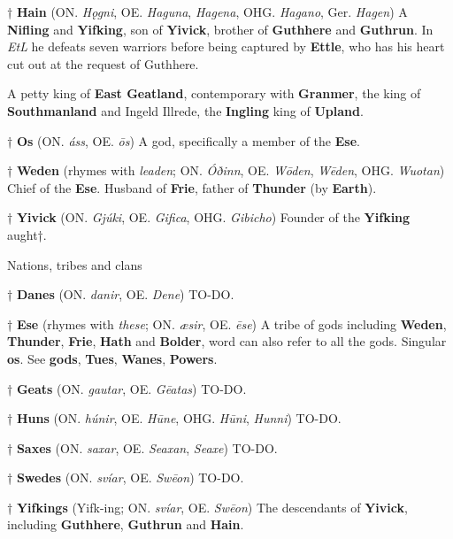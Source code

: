 † \textbf{Hain} (ON. \emph{Hǫgni}, OE. \emph{Haguna}, \emph{Hagena}, OHG. \emph{Hagano}, Ger. \emph{Hagen})
 A \textbf{Nifling} and \textbf{Yifking}, son of \textbf{Yivick}, brother of \textbf{Guthhere} and \textbf{Guthrun}. In \emph{EtL} he defeats seven warriors before being captured by \textbf{Ettle}, who has his heart cut out at the request of Guthhere.
 
 A petty king of \textbf{East Geatland}, contemporary with \textbf{Granmer}, the king of \textbf{Southmanland} and Ingeld Illrede, the \textbf{Ingling} king of \textbf{Upland}.

† \textbf{Os} (ON. \emph{áss}, OE. \emph{ōs})
 A god, specifically a member of the \textbf{Ese}.
 
† \textbf{Weden} (rhymes with \emph{leaden}; ON. \emph{Óðinn}, OE. \emph{Wōden}, \emph{Wēden}, OHG. \emph{Wuotan})
 Chief of the \textbf{Ese}. Husband of \textbf{Frie}, father of \textbf{Thunder} (by \textbf{Earth}).

† \textbf{Yivick} (ON. \emph{Gjúki}, OE. \emph{Gifica}, OHG. \emph{Gibicho})
 Founder of the \textbf{Yifking} aught†.

Nations, tribes and clans

† \textbf{Danes} (ON. \emph{danir}, OE. \emph{Dene})
 TO-DO.

† \textbf{Ese} (rhymes with \emph{these}; ON. \emph{æsir}, OE. \emph{ēse})
 A tribe of gods including \textbf{Weden}, \textbf{Thunder}, \textbf{Frie}, \textbf{Hath} and \textbf{Bolder}, word can also refer to all the gods. Singular \textbf{os}. See \textbf{gods}, \textbf{Tues}, \textbf{Wanes}, \textbf{Powers}.
 
† \textbf{Geats} (ON. \emph{gautar}, OE. \emph{Gēatas})
 TO-DO.

† \textbf{Huns} (ON. \emph{húnir}, OE. \emph{Hūne}, OHG. \emph{Hūni}, \emph{Hunni})
 TO-DO.
 
† \textbf{Saxes} (ON. \emph{saxar}, OE. \emph{Seaxan}, \emph{Seaxe})
 TO-DO.

† \textbf{Swedes} (ON. \emph{svíar}, OE. \emph{Swēon})
 TO-DO.
 
† \textbf{Yifkings} (Yifk-ing; ON. \emph{svíar}, OE. \emph{Swēon})
 The descendants of \textbf{Yivick}, including \textbf{Guthhere}, \textbf{Guthrun} and \textbf{Hain}.
